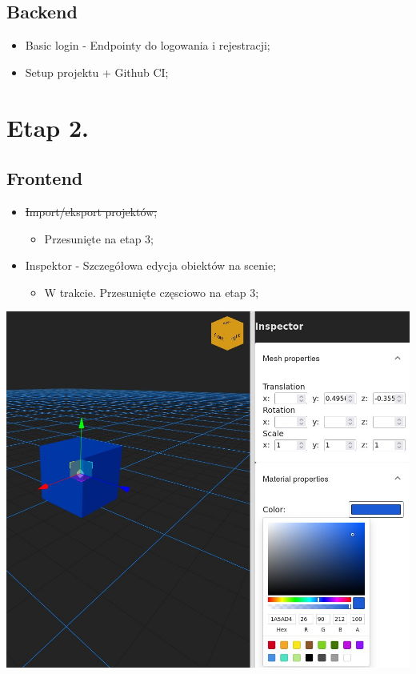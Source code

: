 \documentclass[11pt]{article}
\begin{document}
\subsection{Backend}
\label{sec:org12c91ef}
\begin{itemize}
\item Basic login - Endpointy do logowania i rejestracji;
\item Setup projektu + Github CI;
\end{itemize}
\section{Etap 2.}
\label{sec:org77d494f}
\subsection{Frontend}
\label{sec:org2c9242e}
\begin{itemize}
\item \sout{Import/eksport projektów;}
\begin{itemize}
\item Przesunięte na etap 3;
\end{itemize}
\item Inspektor - Szczegółowa edycja obiektów na scenie;
\begin{itemize}
\item W trakcie. Przesunięte częsciowo na etap 3;
\end{itemize}
\end{itemize}
\begin{center}
\includegraphics[width=.9\linewidth]{./img/inspector-demo.jpg}
\end{center}
\end{document}
